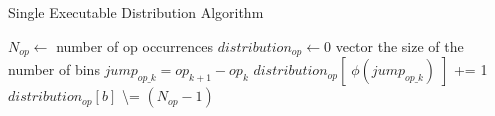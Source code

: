 
\begin{algorithm}
    \caption{Single Executable Distribution Algorithm}
    \begin{algorithmic}
            \STATE $N_{op} \gets $ number of op occurrences
            \STATE $distribution_{op} \gets 0$ vector the size of the number of bins
                \STATE $jump_{op\_k} = op_{k+1} - op_{k}$
                \STATE $distribution_{op}[\;\phi(jump_{op\_k})\;]$ += 1
            \ENDFOR
                \STATE $distribution_{op}[b]$ \textbackslash= $(N_{op}-1)$
            \ENDFOR
        \ENDFOR
    \end{algorithmic}\label{alg:algorithm_single}
\end{algorithm}